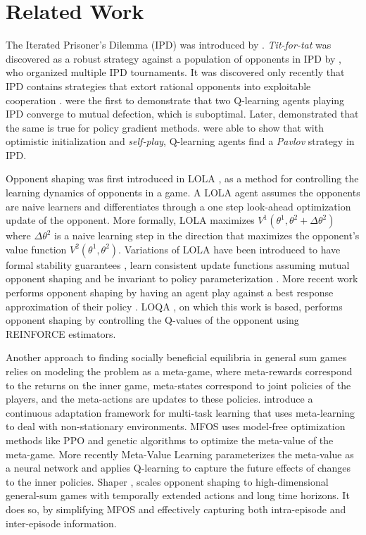 \documentclass{article} \usepackage{iclr2025_conference,times}
\begin{document}
\section{Related Work}
\label{related_work}

The Iterated Prisoner's Dilemma (IPD) was introduced by \citet{rapoport1965prisoner}.  \emph{Tit-for-tat} was discovered as a robust strategy against a population of opponents in IPD by \citet{Axelrod84}, who organized multiple IPD tournaments. It was discovered only recently that IPD contains strategies that extort rational opponents into exploitable cooperation  \citep{press2012iterated}. \citet{sandholm1996multiagent} were the first to demonstrate that two Q-learning agents playing IPD converge to mutual defection, which is suboptimal. Later, \citet{foerster2018learning} demonstrated that the same is true for policy gradient methods. \cite{bertrand2023qlearners} were able to show that with optimistic initialization and \emph{self-play}, Q-learning agents find a \textit{Pavlov} strategy in IPD.

Opponent shaping was first introduced in LOLA \cite{foerster2018learning}, as a method for controlling the learning dynamics of opponents in a game. A LOLA agent assumes the opponents are naive learners and differentiates through a one step look-ahead optimization update of the opponent. More formally, LOLA maximizes $V^1(\theta^1, \theta^2 + \Delta \theta^2)$ where $\Delta \theta^2$ is a naive learning step in the direction that maximizes the opponent's value function $V^2(\theta^1, \theta^2)$. Variations of LOLA have been introduced to have formal stability guarantees \citep{letcher2021stable}, learn consistent update functions assuming mutual opponent shaping \citep{willi2022cola} and be invariant to policy parameterization \citep{zhao2022proximal}. More recent work performs opponent shaping by having an agent play against a best response approximation of their policy \citep{aghajohari2024best}. LOQA \citep{aghajohari2024loqa}, on which this work is based, performs opponent shaping by controlling the Q-values of the opponent using REINFORCE \citep{williams1992simple} estimators. 

Another approach to finding socially beneficial equilibria in general sum games relies on modeling the problem as a meta-game, where meta-rewards correspond to the returns on the inner game, meta-states correspond to joint policies of the players, and the meta-actions are updates to these policies. \cite{alshedivat2018continuous} introduce a continuous adaptation framework for multi-task learning that uses meta-learning to deal with non-stationary environments. MFOS \citep{lu2022modelfree} uses model-free optimization methods like PPO and genetic algorithms to optimize the meta-value of the meta-game. More recently Meta-Value Learning \citep{cooijmans2023metavalue} parameterizes the meta-value as a neural network and applies Q-learning to capture the future effects of changes to the inner policies. Shaper \citep{khan2024scaling},  scales opponent shaping to high-dimensional general-sum games with temporally extended actions and long time horizons. It does so, by simplifying MFOS and effectively capturing both intra-episode and inter-episode information.
\end{document}
